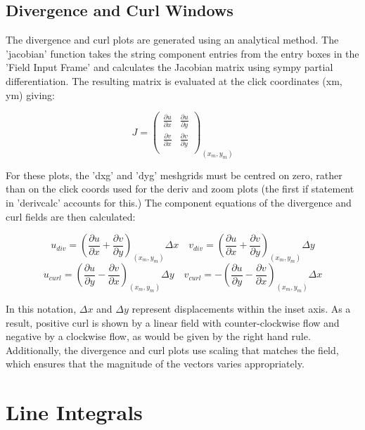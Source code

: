 \documentclass[12pt]{report}
\begin{document}
\subsection{Divergence and Curl Windows}
The divergence and curl plots are generated using an analytical method. The 'jacobian' function takes the string component entries from the entry boxes in the 'Field Input Frame' and calculates the Jacobian matrix using sympy partial differentiation. The resulting matrix is evaluated at the click coordinates (x\textunderscore m, y\textunderscore m) giving:

\begin{equation}
	J =
	\begin{pmatrix}
		\frac{\partial u}{\partial x} & \frac{\partial u}{\partial y} \\
		\frac{\partial v}{\partial x} & \frac{\partial v}{\partial y} \\
	\end{pmatrix}
	_{(x_m,y_m)}
\end{equation}

For these plots, the 'dxg' and 'dyg' meshgrids must be centred on zero, rather than on the click coords used for the deriv and zoom plots (the first if statement in 'deriv\textunderscore calc' accounts for this.) The component equations of the divergence and curl fields are then calculated:

\begin{equation}
	u_{div} = \left( \frac{\partial u}{\partial x} + \frac{\partial v}{\partial y} \right)_{(x_m,y_m)} \Delta x \quad
	v_{div} = \left( \frac{\partial u}{\partial x} + \frac{\partial v}{\partial y} \right)_{(x_m,y_m)} \Delta y	
\end{equation}
\begin{equation}
	u_{curl} = \left( \frac{\partial u}{\partial y} - \frac{\partial v}{\partial x} \right)_{(x_m,y_m)} \Delta y \quad
	v_{curl} = - \left( \frac{\partial u}{\partial y} - \frac{\partial v}{\partial x} \right)_{(x_m,y_m)} \Delta x
\end{equation}

In this notation, $\Delta x$ and $\Delta y$ represent displacements within the inset axis. As a result, positive curl is shown by a linear field with counter-clockwise flow and negative by a clockwise flow, as would be given by the right hand rule. Additionally, the divergence and curl plots use scaling that matches the field, which ensures that the magnitude of the vectors varies appropriately. 

\section{Line Integrals}
\end{document}
